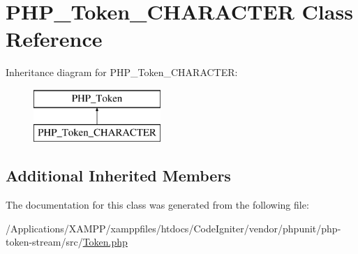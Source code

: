 \hypertarget{class_p_h_p___token___c_h_a_r_a_c_t_e_r}{}\section{P\+H\+P\+\_\+\+Token\+\_\+\+C\+H\+A\+R\+A\+C\+T\+ER Class Reference}
\label{class_p_h_p___token___c_h_a_r_a_c_t_e_r}
Inheritance diagram for P\+H\+P\+\_\+\+Token\+\_\+\+C\+H\+A\+R\+A\+C\+T\+ER\+:\begin{figure}[H]
\begin{center}
\leavevmode
\includegraphics[height=2.000000cm]{class_p_h_p___token___c_h_a_r_a_c_t_e_r}
\end{center}
\end{figure}
\subsection*{Additional Inherited Members}


The documentation for this class was generated from the following file\+:\begin{DoxyCompactItemize}
\item 
/\+Applications/\+X\+A\+M\+P\+P/xamppfiles/htdocs/\+Code\+Igniter/vendor/phpunit/php-\/token-\/stream/src/\mbox{\hyperlink{_token_8php}{Token.\+php}}\end{DoxyCompactItemize}
